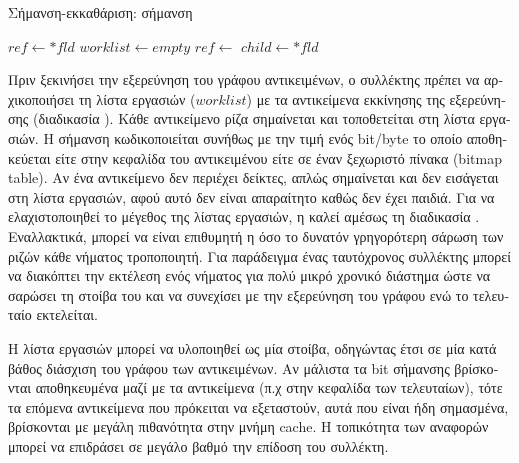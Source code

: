\begin{greek}
\begin{algorithm}
  \caption{Σήμανση-εκκαθάριση: σήμανση}
  \label{alg:mrkswp_2}
  \begin{algorithmic}[1]
      \State {}
        \State $ref \gets *fld$
          \State {}
          \State {}
          \State {}
        \EndIf
      \EndFor
    \EndProcedure
    \Statex
      \State $worklist \gets empty$
    \EndProcedure
    \Statex
        \State $ref \gets$ 
          \State $child \gets *fld$
            \State {}
            \State {}
          \EndIf
        \EndFor
      \EndWhile
    \EndProcedure
  \end{algorithmic}
\end{algorithm}

Πριν ξεκινήσει την εξερεύνηση του γράφου αντικειμένων, ο
συλλέκτης πρέπει να αρχικοποιήσει τη λίστα εργασιών ($worklist$) 
με τα αντικείμενα εκκίνησης της εξερεύνησης (διαδικασία
). Κάθε αντικείμενο ρίζα σημαίνεται 
και τοποθετείται στη λίστα εργασιών. Η σήμανση κωδικοποιείται 
συνήθως με την τιμή ενός bit/byte το οποίο αποθηκεύεται είτε 
στην κεφαλίδα του αντικειμένου είτε σε έναν ξεχωριστό πίνακα 
(bitmap table). Αν ένα αντικείμενο δεν περιέχει δείκτες, 
απλώς σημαίνεται και δεν εισάγεται στη λίστα εργασιών, αφού 
αυτό δεν είναι απαραίτητο καθώς δεν έχει παιδιά. Για να
ελαχιστοποιηθεί το μέγεθος της λίστας εργασιών, η 
 καλεί αμέσως τη διαδικασία
. Εναλλακτικά, μπορεί να είναι επιθυμητή
η όσο το δυνατόν γρηγορότερη σάρωση των ριζών κάθε νήματος
τροποποιητή. Για παράδειγμα ένας ταυτόχρονος συλλέκτης 
μπορεί να διακόπτει την εκτέλεση ενός νήματος για πολύ
μικρό χρονικό διάστημα ώστε να σαρώσει τη στοίβα του
και να συνεχίσει με την εξερεύνηση του γράφου ενώ το
τελευταίο εκτελείται.

Η λίστα εργασιών μπορεί να υλοποιηθεί ως μία στοίβα, οδηγώντας 
έτσι σε μία κατά βάθος διάσχιση του γράφου των αντικειμένων. 
Αν μάλιστα τα bit σήμανσης βρίσκονται αποθηκευμένα μαζί με 
τα αντικείμενα (π.χ στην κεφαλίδα των τελευταίων), τότε τα 
επόμενα αντικείμενα που πρόκειται να εξεταστούν, αυτά που 
είναι ήδη σημασμένα, βρίσκονται με μεγάλη πιθανότητα στην 
μνήμη cache. Η τοπικότητα των αναφορών μπορεί να επιδράσει
σε μεγάλο βαθμό την επίδοση του συλλέκτη.


\end{greek}

